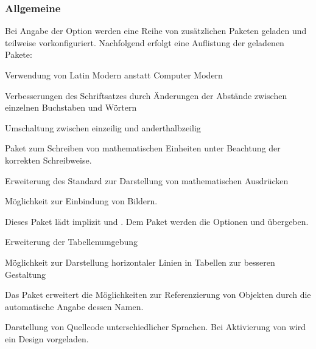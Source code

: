 \documentclass[babel=ngerman,highlight=false]{skdoc}
\begin{document}
            \subsubsection{Allgemeine}
                Bei Angabe der Option  werden eine Reihe von zusätzlichen Paketen geladen und teilweise vorkonfiguriert. Nachfolgend erfolgt eine Auflistung der geladenen Pakete:
                \begin{description}[itemsep=1pt, style=multiline, leftmargin=3cm]
                    \item [\pkg{lmodern}] Verwendung von Latin Modern anstatt Computer Modern
                    \item [\pkg{microtype}] Verbesserungen des Schriftsatzes durch Änderungen der Abstände zwischen einzelnen Buchstaben und Wörtern
                    \item [\pkg{setspace}] Umschaltung zwischen einzeilig und anderthalbzeilig
                    \item [\pkg{siunitx}] Paket zum Schreiben von mathematischen Einheiten unter Beachtung der korrekten Schreibweise.
                    \item [\pkg{mathtools}] Erweiterung des Standard zur Darstellung von mathematischen Ausdrücken
                    \item [\pkg{graphicx}] Möglichkeit zur Einbindung von Bildern.
                    \item [\pkg{tcolobox}] Dieses Paket lädt implizit  und . Dem Paket  werden die Optionen  und  übergeben.
                    \item [\pkg{tabularx}] Erweiterung der Tabellenumgebung
                    \item [\pkg{booktabs}] Möglichkeit zur Darstellung horizontaler Linien in Tabellen zur besseren Gestaltung
                    \item [\pkg{cleveref}] Das Paket erweitert die Möglichkeiten zur Referenzierung von Objekten durch die automatische Angabe dessen Namen.
                    \item [\pkg{listings}] Darstellung von Quellcode unterschiedlicher Sprachen. Bei Aktivierung von  wird ein Design vorgeladen.
                \end{description}
\end{document}
